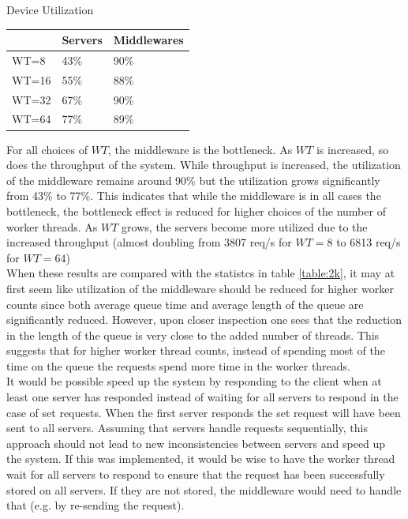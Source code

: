 \documentclass[11pt,a4paper]{article}
\begin{document}
\begin{center}
	{Device Utilization\\}
	\begin{tabular}{|l|p{3cm}|p{3cm}|}
		\hline              & Servers & Middlewares \\ 
		\hline WT=8         & 	43\%	 & 90\%	 \\ 
		\hline WT=16		 & 	55\%	 & 88\%	 \\ 
		\hline WT=32 		 & 	67\%	 & 90\%	 \\ 
		\hline WT=64        & 	77\%	 & 89\%   \\
		\hline 
	\end{tabular}
\end{center}

For all choices of $WT$, the middleware is the bottleneck. As $WT$ is increased, so does the throughput of the system. While throughput is increased, the utilization of the middleware remains around 90\% but the utilization grows significantly from 43\% to 77\%. This indicates that while the middleware is in all cases the bottleneck, the bottleneck effect is reduced for higher choices of the number of worker threads. As $WT$ grows, the servers become more utilized due to the increased throughput (almost doubling from 3807 req/s for $WT=8$ to 6813 req/s for $WT=64$) \\

When these results are compared with the statistcs in table \ref{table:2k}, it may at first seem like utilization of the middleware should be reduced for higher worker counts since both average queue time and average length of the queue are significantly reduced. However, upon closer inspection one sees that the reduction in the length of the queue is very close to the added number of threads. This suggests that for higher worker thread counts, instead of spending most of the time on the queue the requests spend more time in the worker threads.\\

It would be possible speed up the system by responding to the client when at least one server has responded instead of waiting for all servers to respond in the case of set requests. When the first server responds the set request will have been sent to all servers. Assuming that servers handle requests sequentially, this approach should not lead to new inconsistencies between servers and speed up the system. If this was implemented, it would be wise to have the worker thread wait for all servers to respond to ensure that the request has been successfully stored on all servers. If they are not stored, the middleware would need to handle that (e.g. by re-sending the request).
\end{document}
